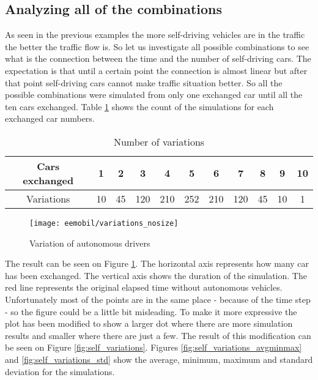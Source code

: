 		\subsection{Analyzing all of the combinations}
		As seen in the previous examples the more self-driving vehicles are in the traffic the better the traffic flow is. So let us investigate all possible combinations to see what is the connection between the time and the number of self-driving cars. The expectation is that until a certain point the connection is almost linear but after that point self-driving cars cannot make traffic situation better.
		So all the possible combinations were simulated from only one exchanged car until all the ten cars exchanged. Table \ref{tab:all_variations} shows the count of the simulations for each exchanged car numbers.
		\begin{table}[ht]
			\begin{center}
				\begin{tabular}{ |c||c|c|c|c|c|c|c|c|c|c| }
					\hline
					Cars exchanged & 1   & 2    & 3    & 4     & 5      & 6     & 7     & 8   & 9   & 10\\
					\hline
					Variations            & 10 & 45 & 120 & 210 & 252 & 210 & 120 & 45 & 10 & 1\\
					\hline
				\end{tabular}
			\end{center}
			\caption{Number of variations}
			\label{tab:all_variations}
		\end{table}
		\begin{figure}
			\centering
			\texttt{[image: eemobil/variations\_nosize]}
			\caption{Variation of autonomous drivers}
			\label{fig:self_variations_nosize}
		\end{figure}

		The result can be seen on Figure \ref{fig:self_variations_nosize}. The horizontal axis represents how many car has been exchanged. The vertical axis shows the duration of the simulation. The red line represents the original elapsed time without autonomous vehicles. Unfortunately most of the points are in the same place - because of the time step - so the figure could be a little bit misleading. To make it more expressive the plot has been modified to show a larger dot where there are more simulation results and smaller where there are just a few. The result of this modification can be seen on Figure \ref{fig:self_variations}. Figures \ref{fig:self_variations_avgminmax} and \ref{fig:self_variations_std} show the average, minimum, maximum and standard deviation for the simulations.
		
